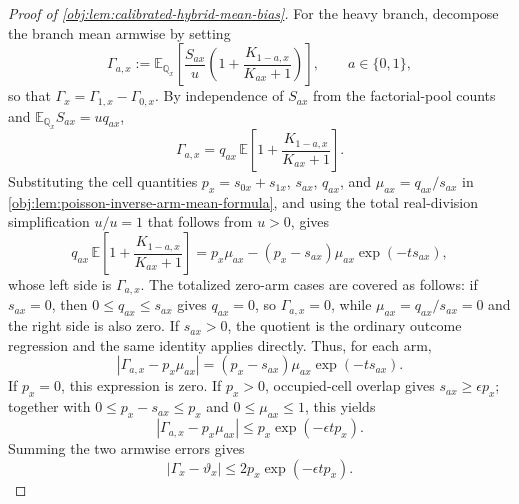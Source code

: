 \begin{proof}[Proof of \cref{obj:lem:calibrated-hybrid-mean-bias}]
For the heavy branch, decompose the branch mean armwise by setting
\[
\Gamma_{a,x}
:=
\mathbb E_{\mathbb Q_x}\!\left[
\frac{S_{ax}}u\left(1+\frac{K_{1-a,x}}{K_{ax}+1}\right)
\right],
\qquad a\in\{0,1\},
\]
so that \(\Gamma_x=\Gamma_{1,x}-\Gamma_{0,x}\).  By independence of \(S_{ax}\) from the factorial-pool counts and \(\mathbb E_{\mathbb Q_x}S_{ax}=uq_{ax}\),
\[
\Gamma_{a,x}
=
q_{ax}\,
\mathbb E\!\left[1+\frac{K_{1-a,x}}{K_{ax}+1}\right].
\]
Substituting the cell quantities \(p_x=s_{0x}+s_{1x}\), \(s_{ax}\), \(q_{ax}\), and \(\mu_{ax}=q_{ax}/s_{ax}\) in \cref{obj:lem:poisson-inverse-arm-mean-formula}, and using the total real-division simplification \(u/u=1\) that follows from \(u>0\), gives
\[
q_{ax}\,
\mathbb E\!\left[1+\frac{K_{1-a,x}}{K_{ax}+1}\right]
=
p_x\mu_{ax}-(p_x-s_{ax})\mu_{ax}\exp(-ts_{ax}),
\]
whose left side is \(\Gamma_{a,x}\).
The totalized zero-arm cases are covered as follows: if \(s_{ax}=0\), then \(0\le q_{ax}\le s_{ax}\) gives \(q_{ax}=0\), so \(\Gamma_{a,x}=0\), while \(\mu_{ax}=q_{ax}/s_{ax}=0\) and the right side is also zero.  If \(s_{ax}>0\), the quotient is the ordinary outcome regression and the same identity applies directly.  Thus, for each arm,
\[
|\Gamma_{a,x}-p_x\mu_{ax}|
=
(p_x-s_{ax})\mu_{ax}\exp(-ts_{ax}).
\]
If \(p_x=0\), this expression is zero.  If \(p_x>0\), occupied-cell overlap gives \(s_{ax}\ge\epsilon p_x\); together with \(0\le p_x-s_{ax}\le p_x\) and \(0\le\mu_{ax}\le1\), this yields
\[
|\Gamma_{a,x}-p_x\mu_{ax}|
\le
p_x\exp(-\epsilon t p_x).
\]
Summing the two armwise errors gives
\[
|\Gamma_x-\vartheta_x|
\le
2p_x\exp(-\epsilon t p_x).
\]


\end{proof}
